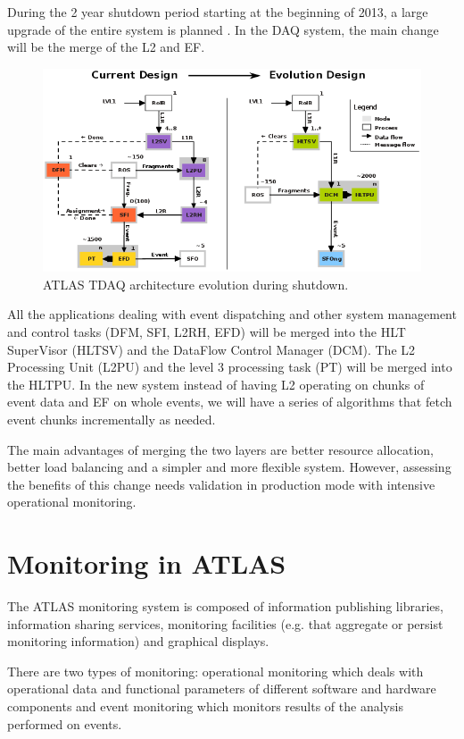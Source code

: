 During the 2 year shutdown period starting at the beginning of 2013, a large upgrade of the entire system is planned \citep{hauser2012atlas}. In the DAQ system, the main change will be the merge of the L2 and EF.  

\begin{figure}[ht!]
\centering
\includegraphics[scale=0.55]{Images/Evolution.png}
\caption{ATLAS TDAQ architecture evolution during shutdown.}
\end{figure}

All the applications dealing with event dispatching and other system management and control tasks (DFM, SFI, L2RH, EFD) will be merged into the HLT SuperVisor (HLTSV) and the DataFlow Control Manager (DCM). 
The L2 Processing Unit (L2PU) and the level 3 processing task (PT) will be merged into the HLTPU. In the new system instead of having L2 operating on chunks of event data and EF on whole events, we will have a series of algorithms that fetch event chunks incrementally as needed.

The main advantages of merging the two layers are better resource allocation, better load balancing and a simpler and more flexible system. However, assessing the benefits of this change needs validation in production mode with intensive operational monitoring.

\section*{Monitoring in ATLAS}

The ATLAS monitoring system \citep{collaboration2003atlas} is composed of information publishing libraries, information sharing services, monitoring facilities (e.g. that aggregate or persist monitoring information) and graphical displays.

There are two types of monitoring: operational monitoring which deals with operational data and functional parameters of different software and hardware components and event monitoring which monitors results of the analysis performed on events.

